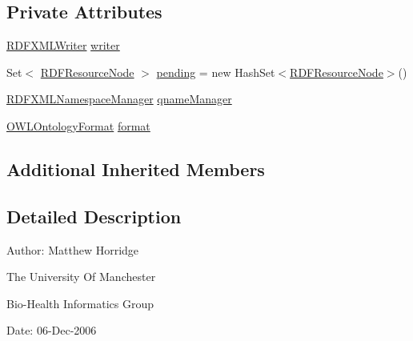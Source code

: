\subsection*{Private Attributes}
\begin{DoxyCompactItemize}
\item 
\hyperlink{classorg_1_1coode_1_1owlapi_1_1rdf_1_1rdfxml_1_1_r_d_f_x_m_l_writer}{R\-D\-F\-X\-M\-L\-Writer} \hyperlink{classorg_1_1coode_1_1owlapi_1_1rdf_1_1rdfxml_1_1_r_d_f_x_m_l_renderer_abaf6f9ce563907bf8a7dc6167e425579}{writer}
\item 
Set$<$ \hyperlink{classorg_1_1coode_1_1owlapi_1_1rdf_1_1model_1_1_r_d_f_resource_node}{R\-D\-F\-Resource\-Node} $>$ \hyperlink{classorg_1_1coode_1_1owlapi_1_1rdf_1_1rdfxml_1_1_r_d_f_x_m_l_renderer_aa90a1b72272f2388cbe9adf746f85257}{pending} = new Hash\-Set$<$\hyperlink{classorg_1_1coode_1_1owlapi_1_1rdf_1_1model_1_1_r_d_f_resource_node}{R\-D\-F\-Resource\-Node}$>$()
\item 
\hyperlink{classorg_1_1coode_1_1owlapi_1_1rdf_1_1rdfxml_1_1_r_d_f_x_m_l_namespace_manager}{R\-D\-F\-X\-M\-L\-Namespace\-Manager} \hyperlink{classorg_1_1coode_1_1owlapi_1_1rdf_1_1rdfxml_1_1_r_d_f_x_m_l_renderer_a50644cd8eed56d46bcccd9317edc7d58}{qname\-Manager}
\item 
\hyperlink{classorg_1_1semanticweb_1_1owlapi_1_1model_1_1_o_w_l_ontology_format}{O\-W\-L\-Ontology\-Format} \hyperlink{classorg_1_1coode_1_1owlapi_1_1rdf_1_1rdfxml_1_1_r_d_f_x_m_l_renderer_a39fbe41be19c78ddc53658620bb01f16}{format}
\end{DoxyCompactItemize}
\subsection*{Additional Inherited Members}


\subsection{Detailed Description}
Author\-: Matthew Horridge\par
 The University Of Manchester\par
 Bio-\/\-Health Informatics Group\par
 Date\-: 06-\/\-Dec-\/2006\par
 \par
 

